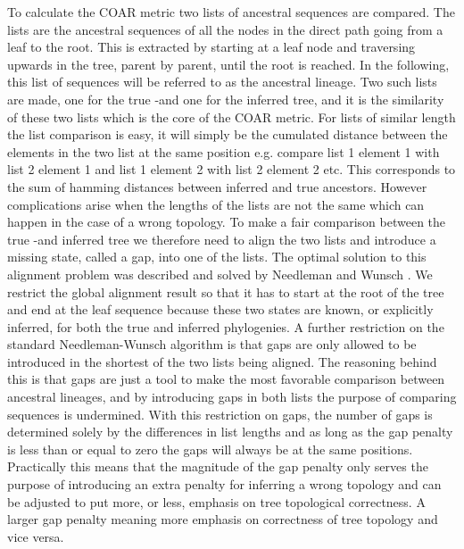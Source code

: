 To calculate the COAR metric two lists of ancestral sequences are compared.
The lists are the ancestral sequences of all the nodes in the direct path going from a leaf to the root.
This is extracted by starting at a leaf node and traversing upwards in the tree, parent by parent, until the root is reached.
In the following, this list of sequences will be referred to as the ancestral lineage.
Two such lists are made, one for the true -and one for the inferred tree, and it is the similarity of these two lists which is the core of the COAR metric.
For lists of similar length the list comparison is easy, it will simply be the cumulated distance between the elements in the two list at the same position e.g. compare list 1 element 1 with list 2 element 1 and list 1 element 2 with list 2 element 2 etc.
This corresponds to the sum of hamming distances between inferred and true ancestors.
However complications arise when the lengths of the lists are not the same which can happen in the case of a wrong topology.
To make a fair comparison between the true -and inferred tree we therefore need to align the two lists and introduce a missing state, called a gap, into one of the lists.
The optimal solution to this alignment problem was described and solved by Needleman and Wunsch \cite{needleman1970general}.
We restrict the global alignment result so that it has to start at the root of the tree and end at the leaf sequence because these two states are known, or explicitly inferred, for both the true and inferred phylogenies. 
A further restriction on the standard Needleman-Wunsch algorithm is that gaps are only allowed to be introduced in the shortest of the two lists being aligned.
The reasoning behind this is that gaps are just a tool to make the most favorable comparison between ancestral lineages, and by introducing gaps in both lists the purpose of comparing sequences is undermined.
With this restriction on gaps, the number of gaps is determined solely by the differences in list lengths and as long as the gap penalty is less than or equal to zero the gaps will always be at the same positions.
Practically this means that the magnitude of the gap penalty only serves the purpose of introducing an extra penalty for inferring a wrong topology and can be adjusted to put more, or less, emphasis on tree topological correctness.
A larger gap penalty meaning more emphasis on correctness of tree topology and vice versa.

